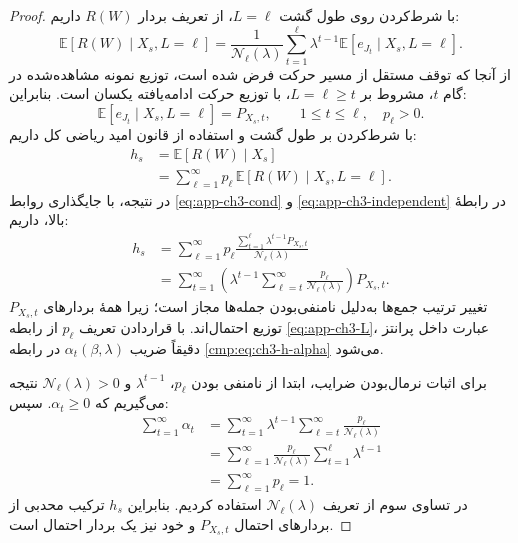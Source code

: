 \begin{proof}
با شرط‌کردن روی طول گشت $L=\ell$، از تعریف بردار $R(W)$ داریم:
\begin{equation}\label{eq:app-ch3-cond}
\mathbb E[R(W)\mid X_s,L=\ell]
=\frac{1}{\mathcal N_\ell(\lambda)}
\sum_{t=1}^{\ell}\lambda^{t-1}
\mathbb E[e_{J_t}\mid X_s,L=\ell].
\end{equation}
از آنجا که توقف مستقل از مسیر حرکت فرض شده است، توزیع نمونه مشاهده‌شده در گام $t$، مشروط بر $L=\ell\ge t$، با توزیع حرکت ادامه‌یافته یکسان است. بنابراین:
\begin{equation}\label{eq:app-ch3-independent}
\mathbb E[e_{J_t}\mid X_s,L=\ell]=P_{X_s,t},
\qquad 1\le t\le\ell,\quad p_\ell>0.
\end{equation}
با شرط‌کردن بر طول گشت و استفاده از قانون امید ریاضی کل داریم:
\begin{equation}\label{eq:app-ch3-total-expectation}
\begin{aligned}
h_s
&=\mathbb E[R(W)\mid X_s]\\[5pt]
&=\sum_{\ell=1}^{\infty}p_\ell\,
\mathbb E[R(W)\mid X_s,L=\ell].
\end{aligned}
\end{equation}
در نتیجه، با جایگذاری روابط \eqref{eq:app-ch3-cond} و \eqref{eq:app-ch3-independent} در رابطهٔ بالا، داریم:
\begin{equation}\label{eq:app-ch3-double-sum}
\begin{aligned}
h_s
&=\sum_{\ell=1}^{\infty}p_\ell
\frac{\sum_{t=1}^{\ell}\lambda^{t-1}P_{X_s,t}}{\mathcal N_\ell(\lambda)}\\
&=\sum_{t=1}^{\infty}
\left(\lambda^{t-1}\sum_{\ell=t}^{\infty}
\frac{p_\ell}{\mathcal N_\ell(\lambda)}\right)P_{X_s,t}.
\end{aligned}
\end{equation}
تغییر ترتیب جمع‌ها به‌دلیل نامنفی‌بودن جمله‌ها مجاز است؛ زیرا همهٔ بردارهای $P_{X_s,t}$ توزیع احتمال‌اند. با قراردادن تعریف $p_\ell$ از رابطه \eqref{eq:app-ch3-L}، عبارت داخل پرانتز دقیقاً ضریب $\alpha_t(\beta,\lambda)$ در رابطه \eqref{cmp:eq:ch3-h-alpha} می‌شود.

برای اثبات نرمال‌بودن ضرایب، ابتدا از نامنفی بودن $p_\ell$، $\lambda^{t-1}$ و $\mathcal N_\ell(\lambda)>0$ نتیجه می‌گیریم که $\alpha_t\ge0$. سپس:
\begin{equation}\label{eq:app-ch3-normalization}
\begin{aligned}
\sum_{t=1}^{\infty}\alpha_t
&=\sum_{t=1}^{\infty}\lambda^{t-1}
\sum_{\ell=t}^{\infty}\frac{p_\ell}{\mathcal N_\ell(\lambda)}\\
&=\sum_{\ell=1}^{\infty}\frac{p_\ell}{\mathcal N_\ell(\lambda)}
\sum_{t=1}^{\ell}\lambda^{t-1}\\
&=\sum_{\ell=1}^{\infty}p_\ell=1.
\end{aligned}
\end{equation}
در تساوی سوم از تعریف $\mathcal N_\ell(\lambda)$ استفاده کردیم. بنابراین $h_s$ ترکیب محدبی از بردارهای احتمال $P_{X_s,t}$ و خود نیز یک بردار احتمال است.
\end{proof}

